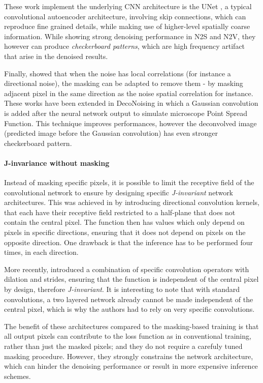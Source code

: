 \documentclass{article}
\begin{document}
These work implement the underlying CNN architecture is the UNet \cite{ronneberger2015u}, a typical convolutional autoencoder architecture, involving skip connections, which can reproduce fine grained details, while making use of higher-level spatially coarse information. While showing strong denoising performance in N2S and N2V, they however can produce \textit{checkerboard patterns}, which are high frequency artifact that arise in the denoised results.

Finally, \cite{broaddus2020removing} showed that when the noise has local correlations (for instance a  directional noise), the masking can be adapted to remove them - by masking adjacent pixel in the same direction as the noise spatial correlation for instance. These works have been extended in DecoNoising \cite{goncharova2020} in which a Gaussian convolution is added after the neural network output to simulate microscope Point Spread Function. This technique improves performances, however the deconvolved image (predicted image before the Gaussian convolution) has even stronger checkerboard pattern.

\paragraph{J-invariance without masking}
Instead of masking specific pixels, it is possible to limit the receptive field of the convolutional network to ensure by designing specific \textit{J-invariant} network architectures. This was achieved in \cite{laine2019high} by introducing directional convolution kernels, that each have their receptive field restricted to a half-plane that does not contain the central pixel. The function then has values which only depend on pixels in specific directions, ensuring that it does not depend on pixels on the opposite direction. One drawback is that the inference has to be performed four times, in each direction.

More recently, \cite{lee2020noise2kernel} introduced a combination of specific convolution operators with dilation and strides, ensuring that the function is independent of the central pixel by design, therefore \textit{J-invariant}. It is interesting to note that with standard convolutions, a two layered network already cannot be made independent of the central pixel, which is why the authors had to rely on very specific convolutions.

The benefit of these architectures compared to the masking-based training is that all output pixels can contribute to the loss function as in conventional training, rather than just the masked pixels; and they do not require a carefuly tuned masking procedure. However, they strongly constrains the network architecture, which can hinder the denoising performance or result in more expensive inference schemes.
\end{document}
